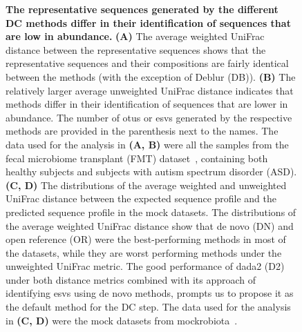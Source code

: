   \begin{figure}[H]
    \centering
    \caption{
      \textbf{The representative sequences generated by the different DC methods differ in their identification of sequences that are low in abundance.}
      \textbf{(A)} The average weighted UniFrac distance between the representative sequences shows that the representative sequences and their compositions are fairly identical between the methods (with the exception of Deblur (DB)).
      \textbf{(B)} The relatively larger average unweighted UniFrac distance indicates that methods differ in their identification of sequences that are lower in abundance.
      The number of \ac{otu}s or \ac{esv}s generated by the respective methods are provided in the parenthesis next to the names.
      The data used for the analysis in \textbf{(A, B)} were all the samples from the fecal microbiome transplant (FMT) dataset~\cite{Kang2017}, containing both healthy subjects and subjects with autism spectrum disorder (ASD).
      \textbf{(C, D)} The distributions of the average weighted and unweighted UniFrac distance between the expected sequence profile and the predicted sequence profile in the mock datasets.
      The distributions of the average weighted UniFrac distance show that de novo (DN) and open reference (OR) were the best-performing methods in most of the datasets, while they are worst performing methods under the unweighted UniFrac metric.
      The good performance of dada2 (D2) under both distance metrics combined with its approach of identifying \ac{esv}s using de novo methods, prompts us to propose it as the default method for the DC step.
      The data used for the analysis in \textbf{(C, D)} were the mock datasets from mockrobiota~\cite{Bokulich2016}.
    }
    \label{fig:figure2}
  \end{figure}


